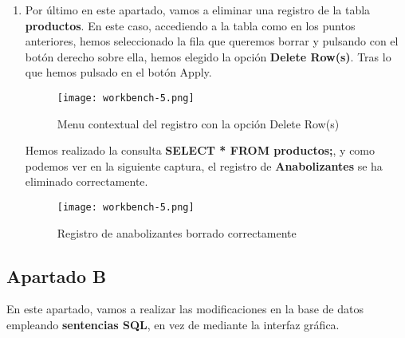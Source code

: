 \begin{enumerate}
    \item Por último en este apartado, vamos a eliminar una registro de la tabla \textbf{productos}. En este caso, accediendo a la tabla como en los puntos anteriores, hemos seleccionado la fila que queremos borrar y pulsando con el botón derecho sobre ella, hemos elegido la opción \textbf{Delete Row(s)}. Tras lo que hemos pulsado en el botón Apply.

    \begin{figure}[H]
        \centering
        \texttt{[image: workbench-5.png]}
        \caption{Menu contextual del registro con la opción Delete Row(s)}
    \end{figure}

    Hemos realizado la consulta \textbf{SELECT * FROM productos;}, y como podemos ver en la siguiente captura, el registro de \textbf{Anabolizantes} se ha eliminado correctamente.

    \begin{figure}[H]
        \centering
        \texttt{[image: workbench-5.png]}
        \caption{Registro de anabolizantes borrado correctamente}
    \end{figure}
\end{enumerate}

\subsection{Apartado B}

En este apartado, vamos a realizar las modificaciones en la base de datos empleando \textbf{sentencias SQL}, en vez de mediante la interfaz gráfica.

